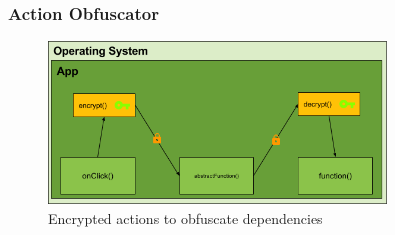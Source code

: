 \subsubsection{Action Obfuscator} \label{subsubsectionection:counter-replace-encryption-content-obfuscator}
\begin{figure}[h]
    \centering
    \includegraphics[width=0.8\textwidth]{data/encryptionAction.png}
    \caption{Encrypted actions to obfuscate dependencies}
    \label{fig:encryptionAction}
\end{figure}
